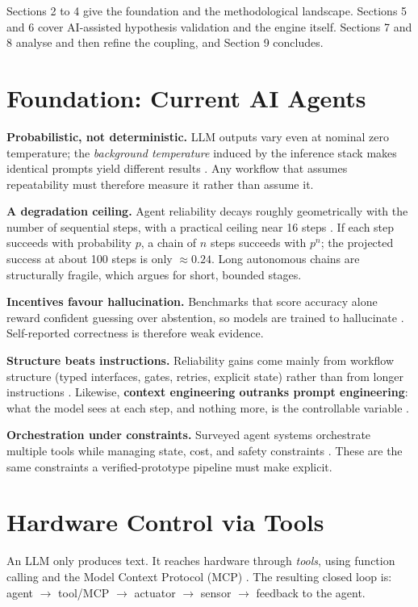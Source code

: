 \documentclass[11pt,a4paper]{article}
\begin{document}
Sections 2 to 4 give the foundation and the methodological landscape. Sections 5 and 6
cover AI-assisted hypothesis validation and the engine itself. Sections 7 and 8 analyse
and then refine the coupling, and Section 9 concludes.

\section{Foundation: Current AI Agents}

\textbf{Probabilistic, not deterministic.} LLM outputs vary even at nominal zero
temperature; the \emph{background temperature} induced by the inference stack makes
identical prompts yield different results \cite{pith2026}. Any workflow that assumes
repeatability must therefore measure it rather than assume it.

\textbf{A degradation ceiling.} Agent reliability decays roughly geometrically with the
number of sequential steps, with a practical ceiling near 16 steps \cite{mittal2026}. If
each step succeeds with probability $p$, a chain of $n$ steps succeeds with
$p^{n}$; the projected success at about 100 steps is only $\approx 0.24$. Long
autonomous chains are structurally fragile, which argues for short, bounded stages.

\textbf{Incentives favour hallucination.} Benchmarks that score accuracy alone reward
confident guessing over abstention, so models are trained to hallucinate
\cite{kalai2026}. Self-reported correctness is therefore weak evidence.

\textbf{Structure beats instructions.} Reliability gains come mainly from workflow
structure (typed interfaces, gates, retries, explicit state) rather than from longer
instructions \cite{nerd2026}. Likewise, \textbf{context engineering outranks prompt
engineering}: what the model sees at each step, and nothing more, is the controllable
variable \cite{anthropic2026}.

\textbf{Orchestration under constraints.} Surveyed agent systems orchestrate multiple
tools while managing state, cost, and safety constraints \cite{tooluse2026}. These are
the same constraints a verified-prototype pipeline must make explicit.

\section{Hardware Control via Tools}

An LLM only produces text. It reaches hardware through \emph{tools}, using function
calling and the Model Context Protocol (MCP) \cite{mcp2025,tooluse2026}. The resulting
closed loop is: agent $\to$ tool/MCP $\to$ actuator $\to$ sensor $\to$ feedback to the
agent.
\end{document}
